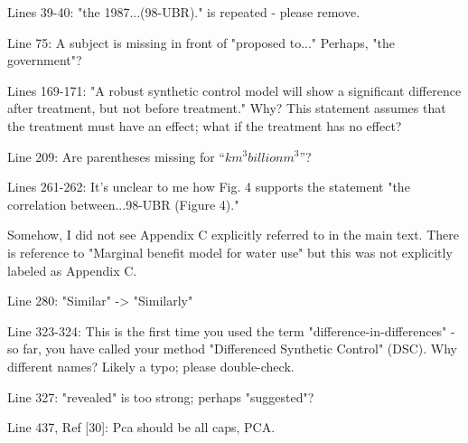 \RC{} Lines 39-40: "the 1987...(98-UBR)." is repeated - please remove.

\RC{} Line 75: A subject is missing in front of "proposed to..." Perhaps, "the government"?

\RC{} Lines 169-171: "A robust synthetic control model will show a significant difference after treatment, but not before treatment." Why? This statement assumes that the treatment must have an effect; what if the treatment has no effect?

\RC{} Line 209: Are parentheses missing for ``$km^3 billion m^3$''?

\RC{} Lines 261-262: It's unclear to me how Fig. 4 supports the statement "the correlation between...98-UBR (Figure 4)."

\RC{} Somehow, I did not see Appendix C explicitly referred to in the main text. There is reference to "Marginal benefit model for water use" but this was not explicitly labeled as Appendix C.

\RC{} Line 280: "Similar" -> "Similarly"

\RC{} Line 323-324: This is the first time you used the term "difference-in-differences" - so far, you have called your method "Differenced Synthetic Control" (DSC). Why different names? Likely a typo; please double-check.

\RC{} Line 327: "revealed" is too strong; perhaps "suggested"?

\RC{} Line 437, Ref [30]: Pca should be all caps, PCA.\
